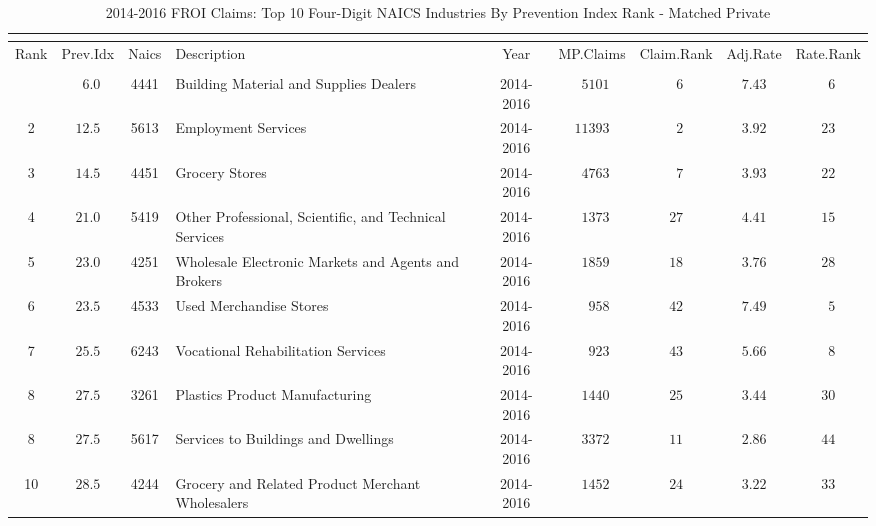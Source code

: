 \documentclass[9pt, oneside]{article}   	%
\begin{document}
\begin{longtable}{cccp{2.5in}ccccc}
\caption{2014-2016 FROI Claims: Top 10 Four-Digit NAICS Industries By Prevention Index Rank - Matched Private}\\ 
\label{Table: 10cc}\\
\hline 
\toprule
  Rank & Prev.Idx & Naics & Description & Year & MP.Claims & Claim.Rank & Adj.Rate & \multicolumn{1}{c}{Rate.Rank} \\ 
  \midrule\\ [-1\normalbaselineskip]\hline\endhead\hline\endfoot
\hline
1  & $\phantom{0}6.0$ & 4441 & Building Material and Supplies Dealers & 2014-2016 & $\phantom{0}5101$ & $\phantom{0}6$ & $7.43$ & $\phantom{0}6$ \\
2 & $12.5$ & 5613 & Employment Services & 2014-2016 & $11393$ & $\phantom{0}2$ & $3.92$ & $23$ \\
3  & $14.5$ & 4451 & Grocery Stores & 2014-2016 & $\phantom{0}4763$ & $\phantom{0}7$ & $3.93$ & $22$ \\
4  & $21.0$ & 5419 & Other Professional, Scientific, and Technical Services & 2014-2016 & $\phantom{0}1373$ & $27$ & $4.41$ & $15$ \\
5  & $23.0$ & 4251 & Wholesale Electronic Markets and Agents and Brokers & 2014-2016 & $\phantom{0}1859$ & $18$ & $3.76$ & $28$ \\
6  & $23.5$ & 4533 & Used Merchandise Stores & 2014-2016 & $\phantom{00}958$ & $42$ & $7.49$ & $\phantom{0}5$ \\
7  & $25.5$ & 6243 & Vocational Rehabilitation Services & 2014-2016 & $\phantom{00}923$ & $43$ & $5.66$ & $\phantom{0}8$ \\
8  & $27.5$ & 3261 & Plastics Product Manufacturing & 2014-2016 & $\phantom{0}1440$ & $25$ & $3.44$ & $30$ \\
8 & $27.5$ & 5617 & Services to Buildings and Dwellings & 2014-2016 & $\phantom{0}3372$ & $11$ & $2.86$ & $44$ \\
10  & $28.5$ & 4244 & Grocery and Related Product Merchant Wholesalers & 2014-2016 & $\phantom{0}1452$ & $24$ & $3.22$ & $33$ \\
\cline{1-1} \cline{2-2} \cline{3-3} \cline{4-4} \cline{5-5} \cline{6-6} \cline{7-7} \cline{8-8} \cline{9-9} %

\hline 
\end{longtable}
\end{document}
